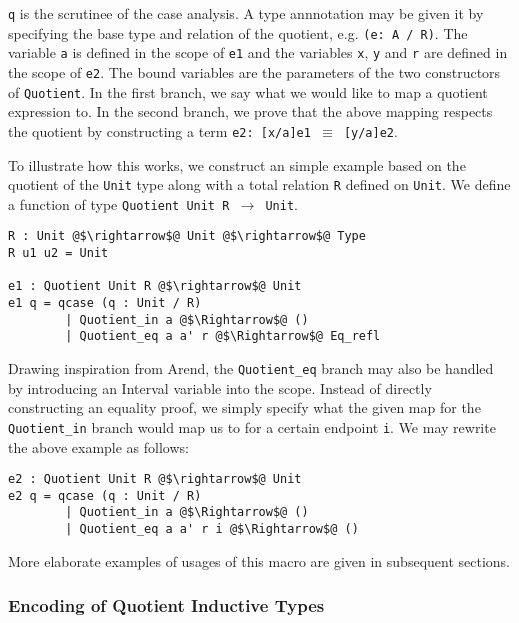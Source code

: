 \documentclass[12pt,twoside,maitrise]{dms}
\theoremstyle{definition}
\numberwithin{equation}{section}
\numberwithin{table}{chapter}
\numberwithin{figure}{chapter}
\newcommand\id[1] {\texttt{#1}}
\newcommand\fn[1] {\texttt{#1}}
\begin{document}
\id{q} is the scrutinee of the case analysis. A type annnotation may be given it
by specifying the base type and relation of the quotient, e.g. \fn{(e: A / R)}.
The variable \id{a} is defined in the scope of \id{e1} and the variables \id{x},
\id{y} and \id{r} are defined in the scope of \id{e2}. The bound variables are
the parameters of the two constructors of \id{Quotient}. In the first branch, we
say what we would like to map a quotient expression to. In the second branch, we
prove that the above mapping respects the quotient by constructing a term
\fn{e2: [x/a]e1 $\equiv$ [y/a]e2}.

To illustrate how this works, we construct an simple example based on the
quotient of the \id{Unit} type along with a total relation \id{R} defined on
\id{Unit}. We define a function of type \fn{Quotient Unit R $\rightarrow$ Unit}.

\begin{verbatim}
R : Unit @$\rightarrow$@ Unit @$\rightarrow$@ Type
R u1 u2 = Unit

e1 : Quotient Unit R @$\rightarrow$@ Unit
e1 q = qcase (q : Unit / R)
        | Quotient_in a @$\Rightarrow$@ ()
        | Quotient_eq a a' r @$\Rightarrow$@ Eq_refl
\end{verbatim}

Drawing inspiration from Arend, the \id{Quotient\_eq} branch may also be handled
by introducing an Interval variable into the scope. Instead of directly
constructing an equality proof, we simply specify what the given map for the
\id{Quotient\_in} branch would map us to for a certain endpoint \id{i}. We may
rewrite the above example as follows:

\begin{verbatim}
e2 : Quotient Unit R @$\rightarrow$@ Unit
e2 q = qcase (q : Unit / R)
        | Quotient_in a @$\Rightarrow$@ ()
        | Quotient_eq a a' r i @$\Rightarrow$@ ()
\end{verbatim}

More elaborate examples of usages of this macro are given in subsequent
sections.

\subsubsection*{Encoding of Quotient Inductive Types}
\end{document}
